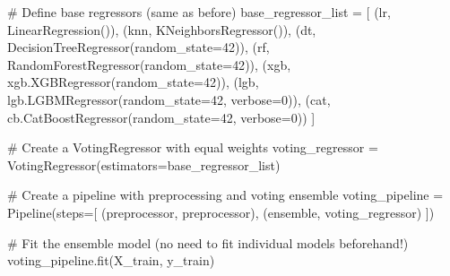 \documentclass[
  letterpaper,
  DIV=11,
  numbers=noendperiod]{scrreprt}
\newenvironment{Shaded}{\begin{snugshade}}{\end{snugshade}}
\newcommand{\CommentTok}[1]{\textcolor[rgb]{0.37,0.37,0.37}{#1}}
\newcommand{\DecValTok}[1]{\textcolor[rgb]{0.68,0.00,0.00}{#1}}
\newcommand{\NormalTok}[1]{\textcolor[rgb]{0.00,0.23,0.31}{#1}}
\newcommand{\OperatorTok}[1]{\textcolor[rgb]{0.37,0.37,0.37}{#1}}
\newcommand{\StringTok}[1]{\textcolor[rgb]{0.13,0.47,0.30}{#1}}
\begin{document}
\begin{Shaded}
\begin{Highlighting}[]
\CommentTok{\# Define base regressors (same as before)}
\NormalTok{base\_regressor\_list }\OperatorTok{=}\NormalTok{ [}
\NormalTok{    (}\StringTok{\textquotesingle{}lr\textquotesingle{}}\NormalTok{, LinearRegression()),}
\NormalTok{    (}\StringTok{\textquotesingle{}knn\textquotesingle{}}\NormalTok{, KNeighborsRegressor()),}
\NormalTok{    (}\StringTok{\textquotesingle{}dt\textquotesingle{}}\NormalTok{, DecisionTreeRegressor(random\_state}\OperatorTok{=}\DecValTok{42}\NormalTok{)),}
\NormalTok{    (}\StringTok{\textquotesingle{}rf\textquotesingle{}}\NormalTok{, RandomForestRegressor(random\_state}\OperatorTok{=}\DecValTok{42}\NormalTok{)),}
\NormalTok{    (}\StringTok{\textquotesingle{}xgb\textquotesingle{}}\NormalTok{, xgb.XGBRegressor(random\_state}\OperatorTok{=}\DecValTok{42}\NormalTok{)),}
\NormalTok{    (}\StringTok{\textquotesingle{}lgb\textquotesingle{}}\NormalTok{, lgb.LGBMRegressor(random\_state}\OperatorTok{=}\DecValTok{42}\NormalTok{, verbose}\OperatorTok{=}\DecValTok{0}\NormalTok{)),}
\NormalTok{    (}\StringTok{\textquotesingle{}cat\textquotesingle{}}\NormalTok{, cb.CatBoostRegressor(random\_state}\OperatorTok{=}\DecValTok{42}\NormalTok{, verbose}\OperatorTok{=}\DecValTok{0}\NormalTok{))}
\NormalTok{]}

\CommentTok{\# Create a VotingRegressor with equal weights}
\NormalTok{voting\_regressor }\OperatorTok{=}\NormalTok{ VotingRegressor(estimators}\OperatorTok{=}\NormalTok{base\_regressor\_list)}

\CommentTok{\# Create a pipeline with preprocessing and voting ensemble}
\NormalTok{voting\_pipeline }\OperatorTok{=}\NormalTok{ Pipeline(steps}\OperatorTok{=}\NormalTok{[}
\NormalTok{    (}\StringTok{\textquotesingle{}preprocessor\textquotesingle{}}\NormalTok{, preprocessor),}
\NormalTok{    (}\StringTok{\textquotesingle{}ensemble\textquotesingle{}}\NormalTok{, voting\_regressor)}
\NormalTok{])}

\CommentTok{\# Fit the ensemble model (no need to fit individual models beforehand!)}
\NormalTok{voting\_pipeline.fit(X\_train, y\_train)}
\end{Highlighting}
\end{Shaded}
\end{document}

